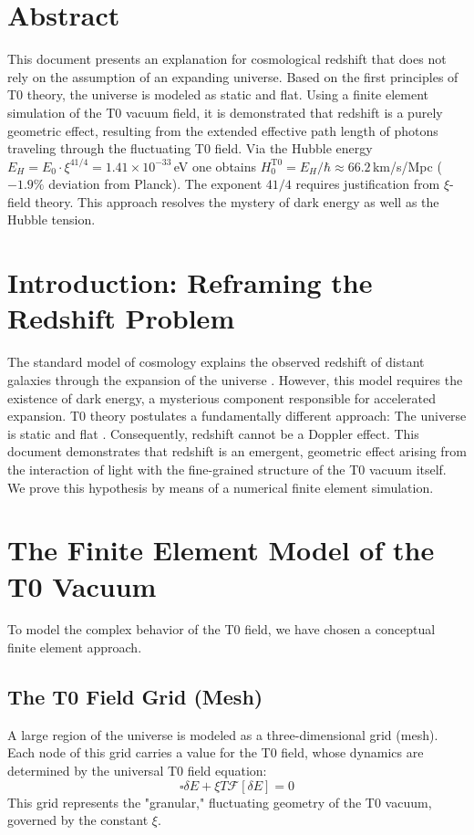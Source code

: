 \section*{Abstract}
		This document presents an explanation for cosmological redshift that does not rely on the assumption of an expanding universe. Based on the first principles of T0 theory, the universe is modeled as static and flat. Using a finite element simulation of the T0 vacuum field, it is demonstrated that redshift is a purely geometric effect, resulting from the extended effective path length of photons traveling through the fluctuating T0 field. Via the Hubble energy $E_H = E_0 \cdot \xi^{41/4} = 1.41 \times 10^{-33}\,$eV one obtains $H_0^{\text{T0}} = E_H/\hbar \approx 66.2\,$km/s/Mpc ($-1.9\%$ deviation from Planck). The exponent $41/4$ requires justification from $\xi$-field theory. This approach resolves the mystery of dark energy as well as the Hubble tension.


	\section{Introduction: Reframing the Redshift Problem}
	The standard model of cosmology explains the observed redshift of distant galaxies through the expansion of the universe \cite{planck2018}. However, this model requires the existence of dark energy, a mysterious component responsible for accelerated expansion. T0 theory postulates a fundamentally different approach: The universe is static and flat \cite{pascher:t0_foundations}. Consequently, redshift cannot be a Doppler effect.
	This document demonstrates that redshift is an emergent, geometric effect arising from the interaction of light with the fine-grained structure of the T0 vacuum itself. We prove this hypothesis by means of a numerical finite element simulation.
	\section{The Finite Element Model of the T0 Vacuum}
	To model the complex behavior of the T0 field, we have chosen a conceptual finite element approach.
	\subsection{The T0 Field Grid (Mesh)}
	A large region of the universe is modeled as a three-dimensional grid (mesh). Each node of this grid carries a value for the T0 field, whose dynamics are determined by the universal T0 field equation:
	\begin{equation}
		\square\delta E + \xi T \mathcal{F}[\delta E] = 0
	\end{equation}
	This grid represents the "granular," fluctuating geometry of the T0 vacuum, governed by the constant $\xi$.
